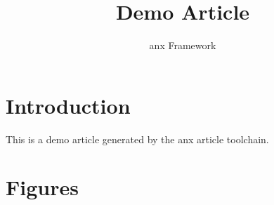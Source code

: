 \documentclass{article}
\title{Demo Article}
\author{anx Framework}
\begin{document}
\maketitle

\section{Introduction}
This is a demo article generated by the anx article toolchain.

\section{Figures}
\end{document}
